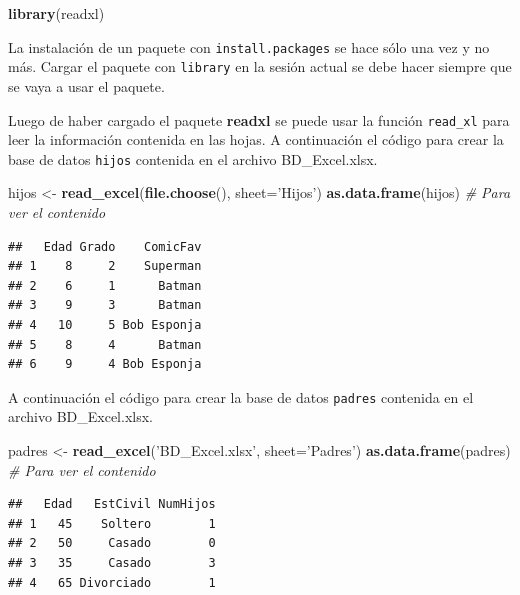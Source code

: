 \documentclass[10pt,]{krantz}
\makeatletter
\newenvironment{Shaded}{\begin{snugshade}}{\end{snugshade}}
\newcommand{\KeywordTok}[1]{\textcolor[rgb]{0.13,0.29,0.53}{\textbf{#1}}}
\newcommand{\DataTypeTok}[1]{\textcolor[rgb]{0.13,0.29,0.53}{#1}}
\newcommand{\StringTok}[1]{\textcolor[rgb]{0.31,0.60,0.02}{#1}}
\newcommand{\CommentTok}[1]{\textcolor[rgb]{0.56,0.35,0.01}{\textit{#1}}}
\newcommand{\NormalTok}[1]{#1}
\newenvironment{kframe}{%
\medskip{}
\setlength{\fboxsep}{.8em}
 \def\at@end@of@kframe{}%
 \ifinner\ifhmode%
  \def\at@end@of@kframe{\end{minipage}}%
  \begin{minipage}{\columnwidth}%
 \fi\fi%
 \def\FrameCommand##1{\hskip\@totalleftmargin \hskip-\fboxsep
 \colorbox{shadecolor}{##1}\hskip-\fboxsep
     \hskip-\linewidth \hskip-\@totalleftmargin \hskip\columnwidth}%
 \MakeFramed {\advance\hsize-\width
   \@totalleftmargin\z@ \linewidth\hsize
   \@setminipage}}%
 {\par\unskip\endMakeFramed%
 \at@end@of@kframe}
\renewenvironment{Shaded}{\begin{kframe}}{\end{kframe}}
\let\BeginKnitrBlock\begin \let\EndKnitrBlock\end
\makeatother
\begin{document}
\begin{Shaded}
\begin{Highlighting}[]
\KeywordTok{library}\NormalTok{(readxl)}
\end{Highlighting}
\end{Shaded}

\BeginKnitrBlock{rmdwarning}
La instalación de un paquete con \texttt{install.packages} se hace sólo
una vez y no más. Cargar el paquete con \texttt{library} en la sesión
actual se debe hacer siempre que se vaya a usar el paquete.
\EndKnitrBlock{rmdwarning}

Luego de haber cargado el paquete \textbf{readxl} se puede usar la
función \texttt{read\_xl} para leer la información contenida en las
hojas. A continuación el código para crear la base de datos
\texttt{hijos} contenida en el archivo BD\_Excel.xlsx.

\begin{Shaded}
\begin{Highlighting}[]
\NormalTok{hijos <-}\StringTok{ }\KeywordTok{read_excel}\NormalTok{(}\KeywordTok{file.choose}\NormalTok{(), }\DataTypeTok{sheet=}\StringTok{'Hijos'}\NormalTok{)}
\KeywordTok{as.data.frame}\NormalTok{(hijos)  }\CommentTok{# Para ver el contenido}
\end{Highlighting}
\end{Shaded}

\begin{verbatim}
##   Edad Grado    ComicFav
## 1    8     2    Superman
## 2    6     1      Batman
## 3    9     3      Batman
## 4   10     5 Bob Esponja
## 5    8     4      Batman
## 6    9     4 Bob Esponja
\end{verbatim}

A continuación el código para crear la base de datos \texttt{padres}
contenida en el archivo BD\_Excel.xlsx.

\begin{Shaded}
\begin{Highlighting}[]
\NormalTok{padres <-}\StringTok{ }\KeywordTok{read_excel}\NormalTok{(}\StringTok{'BD_Excel.xlsx'}\NormalTok{, }\DataTypeTok{sheet=}\StringTok{'Padres'}\NormalTok{)}
\KeywordTok{as.data.frame}\NormalTok{(padres)  }\CommentTok{# Para ver el contenido}
\end{Highlighting}
\end{Shaded}

\begin{verbatim}
##   Edad   EstCivil NumHijos
## 1   45    Soltero        1
## 2   50     Casado        0
## 3   35     Casado        3
## 4   65 Divorciado        1
\end{verbatim}
\end{document}

